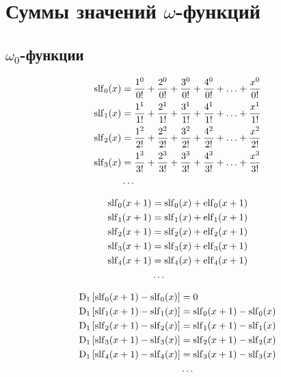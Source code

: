 
\section{Суммы значений $\omega$-функций}

\subsection{$\omega_0$-функции}

\begin{equation*} \begin{aligned}
\slf_0(x) &=
  \frac{1^0}{0!} 
+ \frac{2^0}{0!} 
+ \frac{3^0}{0!} 
+ \frac{4^0}{0!} 
+ \ldots 
+ \frac{x^0}{0!} \\
%
\slf_1(x) &= 
  \frac{1^1}{1!} 
+ \frac{2^1}{1!} 
+ \frac{3^1}{1!} 
+ \frac{4^1}{1!} 
+ \ldots 
+ \frac{x^1}{1!} \\
%
\slf_2(x) &= 
  \frac{1^2}{2!} 
+ \frac{2^2}{2!} 
+ \frac{3^2}{2!} 
+ \frac{4^2}{2!} 
+ \ldots 
+ \frac{x^2}{2!} \\
%
\slf_3(x) &= 
  \frac{1^3}{3!} 
+ \frac{2^3}{3!} 
+ \frac{3^3}{3!} 
+ \frac{4^3}{3!} 
+ \ldots 
+ \frac{x^3}{3!} \\
%
&\ldots \\
\end{aligned} \end{equation*}

\begin{equation*} \begin{aligned}
\operatorname{slf}_0(x + 1) &= 
  \operatorname{slf}_0(x) + \operatorname{elf}_0(x + 1)
\\
\operatorname{slf}_1(x + 1) &= 
  \operatorname{slf}_1(x) + \operatorname{elf}_1(x + 1)  
\\
\operatorname{slf}_2(x + 1) &= 
  \operatorname{slf}_2(x) + \operatorname{elf}_2(x + 1)  
\\
\operatorname{slf}_3(x + 1) &= 
  \operatorname{slf}_3(x) + \operatorname{elf}_3(x + 1)  
\\
\operatorname{slf}_4(x + 1) &= 
  \operatorname{slf}_4(x) + \operatorname{elf}_4(x + 1)  
\\
&\ldots \\
\end{aligned} \end{equation*}

\begin{equation*} \begin{aligned}
\mathrm{D}_1 \left[\operatorname{slf}_0(x + 1) - \operatorname{slf}_0(x) \right] &= 0
\\
\mathrm{D}_1 \left[\operatorname{slf}_1(x + 1) - \operatorname{slf}_1(x) \right] &= \operatorname{slf}_0(x + 1) - \operatorname{slf}_0(x)  
\\
\mathrm{D}_1 \left[\operatorname{slf}_2(x + 1) - \operatorname{slf}_2(x) \right] &= \operatorname{slf}_1(x + 1) - \operatorname{slf}_1(x)  
\\
\mathrm{D}_1 \left[\operatorname{slf}_3(x + 1) - \operatorname{slf}_3(x) \right] &= \operatorname{slf}_2(x + 1) - \operatorname{slf}_2(x)  
\\
\mathrm{D}_1 \left[\operatorname{slf}_4(x + 1) - \operatorname{slf}_4(x) \right] &= \operatorname{slf}_3(x + 1) - \operatorname{slf}_3(x)  
\\
&\ldots \\
\end{aligned} \end{equation*}

